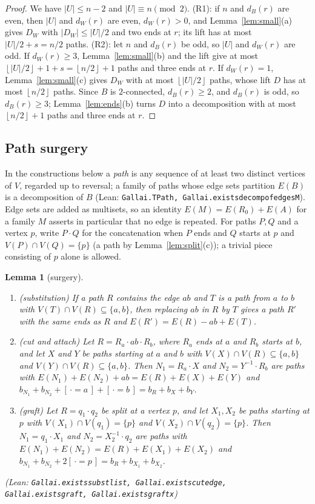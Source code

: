 \documentclass[11pt]{amsart}
\newtheorem{lemma}[theorem]{Lemma}
\theoremstyle{definition}
\theoremstyle{remark}
\renewcommand{\_}{\oldunderscore\allowbreak}
\newcommand{\lean}[1]{\textup{(Lean: {\small\texttt{#1}})}}
\newcommand{\leanst}[1]{\par{\raggedright\small\textup{(Lean: \texttt{#1})}\par}}
\newcommand{\fl}[1]{\left\lfloor #1\right\rfloor}
\newcommand{\ind}[1]{[\,#1\,]}
\begin{document}
\begin{proof}
We have $|U|\le n-2$ and $|U|\equiv n\pmod 2$. (R1): if $n$ and $d_B(r)$ are even, then $|U|$ and
$d_W(r)$ are even, $d_W(r)>0$, and Lemma~\ref{lem:small}(a) gives $D_W$ with $|D_W|\le|U|/2$ and two
ends at $r$; its lift has at most $|U|/2+s=n/2$ paths. (R2): let $n$ and $d_B(r)$ be odd, so $|U|$
and $d_W(r)$ are odd. If $d_W(r)\ge3$, Lemma~\ref{lem:small}(b) and the lift give at most
$\fl{|U|/2}+1+s=\fl{n/2}+1$ paths and three ends at $r$. If $d_W(r)=1$, Lemma~\ref{lem:small}(c)
gives $D_W$ with at most $\fl{|U|/2}$ paths, whose lift $D$ has at most $\fl{n/2}$ paths. Since $B$
is $2$-connected, $d_B(r)\ge2$, and $d_B(r)$ is odd, so $d_B(r)\ge3$; Lemma~\ref{lem:ends}(b) turns
$D$ into a decomposition with at most $\fl{n/2}+1$ paths and three ends at $r$.
\end{proof}

\subsection{Path surgery}
In the constructions below a \emph{path} is any sequence of at least two distinct vertices of $V$,
regarded up to reversal; a family of paths whose edge sets partition $E(B)$ is a decomposition of $B$
\lean{Gallai.TPath, Gallai.exists\_decomp\_of\_edgesM}. Edge sets are added as multisets, so an
identity $E(M)=E(R_0)+E(A)$ for a family $M$ asserts in particular that no edge is repeated. For
paths $P,Q$ and a vertex $p$, write $P\cdot Q$ for the concatenation when $P$ ends and $Q$ starts at
$p$ and $V(P)\cap V(Q)=\{p\}$ (a path by Lemma~\ref{lem:split}(c)); a trivial piece consisting of $p$
alone is allowed.

\begin{lemma}[surgery]\label{lem:surgery}
\begin{enumerate}[label=\textup{(\alph*)}]
\item \emph{(substitution)} If a path $R$ contains the edge $ab$ and $T$ is a path from $a$ to $b$
with $V(T)\cap V(R)\subseteq\{a,b\}$, then replacing $ab$ in $R$ by $T$ gives a path $R'$ with the
same ends as $R$ and $E(R')=E(R)-ab+E(T)$.
\item \emph{(cut and attach)} Let $R=R_a\cdot ab\cdot R_b$, where $R_a$ ends at $a$ and $R_b$ starts
at $b$, and let $X$ and $Y$ be paths starting at $a$ and $b$ with $V(X)\cap V(R)\subseteq\{a,b\}$ and
$V(Y)\cap V(R)\subseteq\{a,b\}$. Then $N_1=R_a\cdot X$ and $N_2=Y^{-1}\cdot R_b$ are paths with
$E(N_1)+E(N_2)+ab=E(R)+E(X)+E(Y)$ and $b_{N_1}+b_{N_2}+\ind{\cdot=a}+\ind{\cdot=b}=b_R+b_X+b_Y$.
\item \emph{(graft)} Let $R=q_1\cdot q_2$ be split at a vertex $p$, and let $X_1,X_2$ be paths starting
at $p$ with $V(X_1)\cap V(q_1)=\{p\}$ and $V(X_2)\cap V(q_2)=\{p\}$. Then $N_1=q_1\cdot X_1$ and
$N_2=X_2^{-1}\cdot q_2$ are paths with $E(N_1)+E(N_2)=E(R)+E(X_1)+E(X_2)$ and
$b_{N_1}+b_{N_2}+2\ind{\cdot=p}=b_R+b_{X_1}+b_{X_2}$.
\end{enumerate}
\leanst{Gallai.exists\_subst\_list, Gallai.exists\_cut\_edge, Gallai.exists\_graft,
Gallai.exists\_graft\_x}
\end{lemma}
\end{document}
